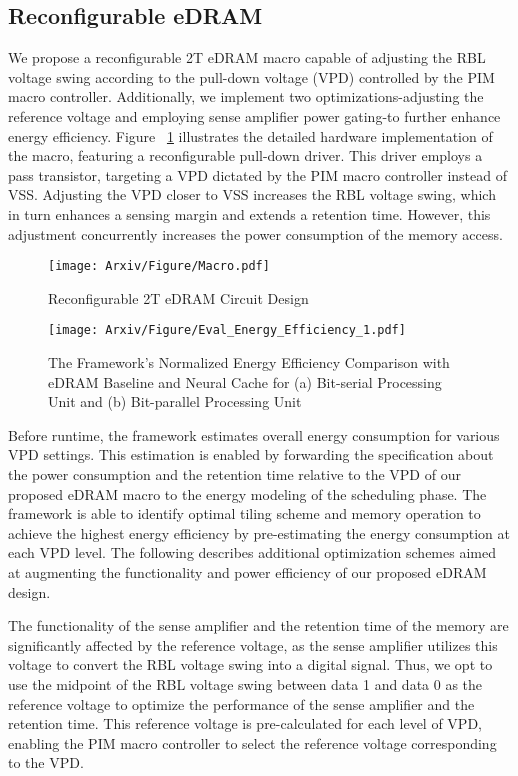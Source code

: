 \subsection{Reconfigurable eDRAM}
We propose a reconfigurable 2T eDRAM macro capable of adjusting the RBL voltage swing according to the pull-down voltage (VPD) controlled by the PIM macro controller. Additionally, we implement two optimizations-adjusting the reference voltage and employing sense amplifier power gating-to further enhance energy efficiency. Figure ~\ref{figure7} illustrates the detailed hardware implementation of the macro, featuring a reconfigurable pull-down driver. This driver employs a pass transistor, targeting a VPD dictated by the PIM macro controller instead of VSS. Adjusting the VPD closer to VSS increases the RBL voltage swing, which in turn enhances a sensing margin and extends a retention time. However, this adjustment concurrently increases the power consumption of the memory access. 

\begin{figure}[t]
\centering
\texttt{[image: Arxiv/Figure/Macro.pdf]}
\caption{Reconfigurable 2T eDRAM Circuit Design}
\vspace{-0.1in}
\label{figure7}
\end{figure}

\begin{figure*}[t]
\centering
\texttt{[image: Arxiv/Figure/Eval\_Energy\_Efficiency\_1.pdf]}
\caption{The \sysname Framework’s Normalized Energy Efficiency Comparison with eDRAM Baseline and Neural Cache for (a) Bit-serial Processing Unit and (b) Bit-parallel Processing Unit}
\label{figure_energy_efficiency_1}
\end{figure*}

Before runtime, the \sysname framework estimates overall energy consumption for various VPD settings. This estimation is enabled by forwarding the specification about the power consumption and the retention time relative to the VPD of our proposed eDRAM macro to the energy modeling of the scheduling phase. The \sysname framework is able to identify optimal tiling scheme and memory operation to achieve the highest energy efficiency by pre-estimating the energy consumption at each VPD level. The following describes additional optimization schemes aimed at augmenting the functionality and power efficiency of our proposed eDRAM design.

The functionality of the sense amplifier and the retention time of the memory are significantly affected by the reference voltage, as the sense amplifier utilizes this voltage to convert the RBL voltage swing into a digital signal. Thus, we opt to use the midpoint of the RBL voltage swing between data 1 and data 0 as the reference voltage to optimize the performance of the sense amplifier and the retention time. This reference voltage is pre-calculated for each level of VPD, enabling the PIM macro controller to select the reference voltage corresponding to the VPD.

